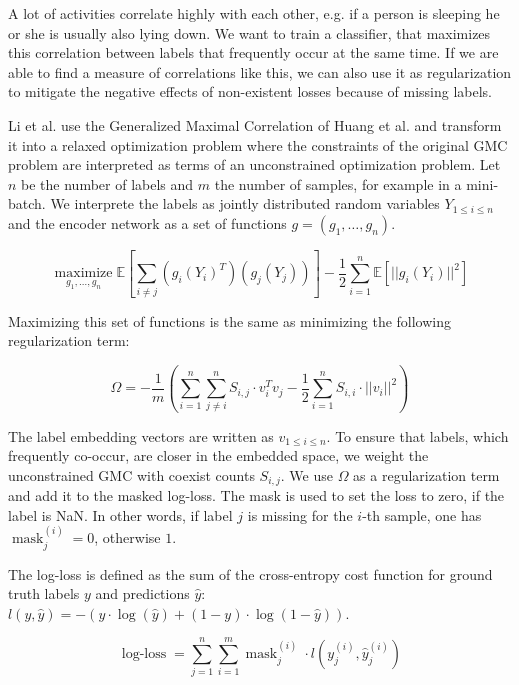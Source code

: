 A lot of activities correlate highly with each other, e.g. if a person is sleeping he or she is usually also lying down. We want to train a classifier, that maximizes this correlation between labels that frequently occur at the same time. If we are able to find a measure of correlations like this, we can also use it as regularization to mitigate the negative effects of non-existent losses because of missing labels.

Li et al. use the Generalized Maximal Correlation of Huang et al. \cite[Definition 2]{Huang2017} and transform it into a relaxed optimization problem where the constraints of the original GMC problem are interpreted as terms of an unconstrained optimization problem. Let $n$ be the number of labels and $m$ the number of samples, for example in a mini-batch. We interprete the labels as jointly distributed random variables $Y_{1\leq i \leq n}$ and the encoder network as a set of functions $g = (g_1, \dots, g_n)$.  

\begin{equation}
	\operatorname{maximize}\limits_{g_1, \dots, g_n} \mathbb{E}\left[\sum_{i\neq j} 
	(g_i(Y_i)^T)(g_j(Y_j)) \right] - \frac{1}{2} \sum_{i=1}^{n} \mathbb{E}[||g_i(Y_i)||^2]
\end{equation}

Maximizing this set of functions is the same as minimizing the following regularization term:

\begin{equation}
	\Omega = - \frac{1}{m} \left(\sum_{i=1}^{n} \sum_{j \neq i}^{n} S_{i,j}\cdot v_i^T v_j - \frac{1}{2} \sum_{i=1}^{n} S_{i,i}\cdot ||v_i||^2 \right)
\end{equation}

The label embedding vectors are written as $v_{1\leq i \leq n}$. To ensure that labels, which frequently co-occur, are closer in the embedded space, we weight the unconstrained GMC with coexist counts $S_{i,j}$. We use $\Omega$ as a regularization term and add it to the masked log-loss. The mask is used to set the loss to zero, if the label is NaN. In other words, if label $j$ is missing for the $i$-th sample, one has $\operatorname{mask}_j^{(i)} = 0$, otherwise $1$.

The log-loss is defined as the sum of the cross-entropy cost function for ground truth labels $y$ and predictions $\hat{y}$: $l(y, \hat{y}) = -(y \cdot \log(\hat{y}) + (1 - y) \cdot \log(1 - \hat{y}))$.

\begin{equation}
	\operatorname{log-loss} = \sum_{j=1}^{n}\sum_{i=1}^{m} \operatorname{mask}_j^{(i)} \cdot l(y_j^{(i)}, \hat{y}_j^{(i)})
\end{equation}


